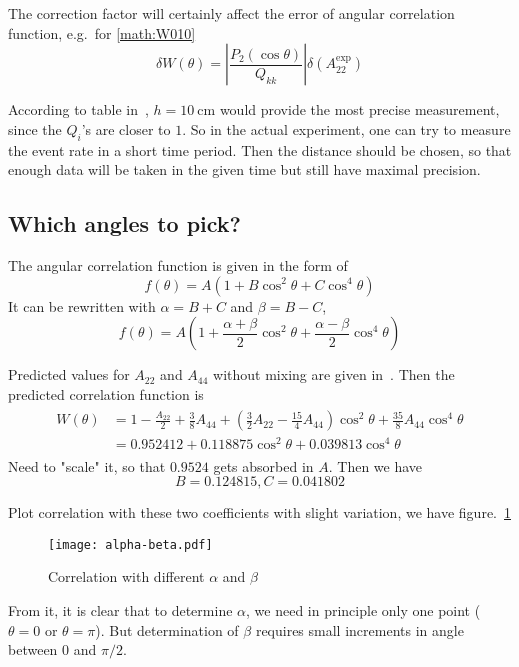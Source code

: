The correction factor will certainly affect the error of angular correlation function, e.g.~for \eqref{math:W010}
\begin{equation}
   \delta W(\theta) = \left| \frac{P_2 (\cos\theta)}{Q_{kk}} \right| \delta (A_{22}^\text{exp})
\end{equation}

According to table in~\cite{siegbahn}, $h=\SI{10}{\cm}$ would provide the most precise measurement, since the $Q_i$'s are closer to $1$. So in the actual experiment, one can try to measure the event rate in a short time period. Then the distance should be chosen, so that enough data will be taken in the given time but still have maximal precision.

\subsection{Which angles to pick?}
The angular correlation function is given in the form of~\cite{descr}
\begin{equation}
   f(\theta) = A(1 + B \cos^2\theta + C \cos^4 \theta)
   \label{math:fTheta}
\end{equation}
It can be rewritten with $\alpha= B + C$ and $\beta = B-C$,
\begin{equation}
   f(\theta) = A \left( 1 + \frac{\alpha + \beta}{ 2} \cos^2\theta + \frac{\alpha-\beta}{2} \cos^4 \theta \right)
\end{equation}

Predicted values for $A_{22}$ and $A_{44}$ without mixing are given in~\cite{siegbahn}. Then the predicted correlation function is
\begin{align}
   \begin{split}
   W(\theta) &= 1 - \frac{A_{22}}{2} + \frac{3}{8} A_{44} + \left( \frac{3}{2} A_{22} - \frac{15}{4} A_{44} \right) \cos^2 \theta + \frac{35}{8} A_{44} \cos^4 \theta \\
   &= 0.952412 + 0.118875 \cos^2 \theta + 0.039813 \cos^4 \theta
   \end{split}\label{math:pred}
\end{align}
Need to "scale" it, so that $0.9524$ gets absorbed in $A$. Then we have
\begin{equation}
   B=0.124815, C=0.041802
\end{equation}

Plot correlation with these two coefficients with slight variation, we have figure.~\ref{fig:alpha-beta}
\begin{figure}[ht]
   \centering
   \texttt{[image: alpha-beta.pdf]}
   \caption{Correlation with different $\alpha$ and $\beta$}%
   \label{fig:alpha-beta}
\end{figure}
From it, it is clear that to determine $\alpha$, we need in principle only one point ($\theta=0$ or $\theta=\pi$). But determination of $\beta$  requires small increments in angle between $0$ and $\pi/2$.
